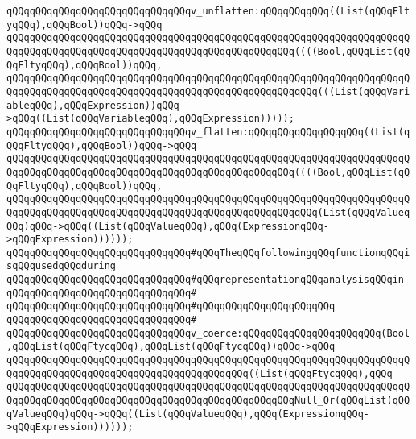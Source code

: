 \newline
\verb|qQQqqQQqqQQqqQQqqQQqqQQqqQQqqQQqv_unflatten:qQQqqQQqqQQq((List(qQQqFltyqQQq),qQQqBool))qQQq->qQQq|\newline
\verb|qQQqqQQqqQQqqQQqqQQqqQQqqQQqqQQqqQQqqQQqqQQqqQQqqQQqqQQqqQQqqQQqqQQqqQQqqQQqqQQqqQQqqQQqqQQqqQQqqQQqqQQqqQQqqQQqqQQqqQQq((((Bool,qQQqList(qQQqFltyqQQq),qQQqBool))qQQq,|\newline
\verb|qQQqqQQqqQQqqQQqqQQqqQQqqQQqqQQqqQQqqQQqqQQqqQQqqQQqqQQqqQQqqQQqqQQqqQQqqQQqqQQqqQQqqQQqqQQqqQQqqQQqqQQqqQQqqQQqqQQqqQQqqQQq(((List(qQQqVariableqQQq),qQQqExpression))qQQq->qQQq((List(qQQqVariableqQQq),qQQqExpression)))));|\newline
\newline
\verb|qQQqqQQqqQQqqQQqqQQqqQQqqQQqqQQqv_flatten:qQQqqQQqqQQqqQQqqQQq((List(qQQqFltyqQQq),qQQqBool))qQQq->qQQq|\newline
\verb|qQQqqQQqqQQqqQQqqQQqqQQqqQQqqQQqqQQqqQQqqQQqqQQqqQQqqQQqqQQqqQQqqQQqqQQqqQQqqQQqqQQqqQQqqQQqqQQqqQQqqQQqqQQqqQQqqQQqqQQq((((Bool,qQQqList(qQQqFltyqQQq),qQQqBool))qQQq,|\newline
\verb|qQQqqQQqqQQqqQQqqQQqqQQqqQQqqQQqqQQqqQQqqQQqqQQqqQQqqQQqqQQqqQQqqQQqqQQqqQQqqQQqqQQqqQQqqQQqqQQqqQQqqQQqqQQqqQQqqQQqqQQqqQQq(List(qQQqValueqQQq)qQQq->qQQq((List(qQQqValueqQQq),qQQq(ExpressionqQQq->qQQqExpression))))));|\newline
\newline
\verb|qQQqqQQqqQQqqQQqqQQqqQQqqQQqqQQq#qQQqTheqQQqfollowingqQQqfunctionqQQqisqQQqusedqQQqduring|\newline
\verb|qQQqqQQqqQQqqQQqqQQqqQQqqQQqqQQq#qQQqrepresentationqQQqanalysisqQQqin|\newline
\verb|qQQqqQQqqQQqqQQqqQQqqQQqqQQqqQQq#|\newline
\verb|qQQqqQQqqQQqqQQqqQQqqQQqqQQqqQQq#qQQqqQQqqQQqqQQqqQQq|\verb|qQQq|\newline
\verb|qQQqqQQqqQQqqQQqqQQqqQQqqQQqqQQq#|\newline
\verb|qQQqqQQqqQQqqQQqqQQqqQQqqQQqqQQqv_coerce:qQQqqQQqqQQqqQQqqQQqqQQq(Bool,qQQqList(qQQqFtycqQQq),qQQqList(qQQqFtycqQQq))qQQq->qQQq|\newline
\verb|qQQqqQQqqQQqqQQqqQQqqQQqqQQqqQQqqQQqqQQqqQQqqQQqqQQqqQQqqQQqqQQqqQQqqQQqqQQqqQQqqQQqqQQqqQQqqQQqqQQqqQQqqQQqqQQq((List(qQQqFtycqQQq),qQQq|\newline
\verb|qQQqqQQqqQQqqQQqqQQqqQQqqQQqqQQqqQQqqQQqqQQqqQQqqQQqqQQqqQQqqQQqqQQqqQQqqQQqqQQqqQQqqQQqqQQqqQQqqQQqqQQqqQQqqQQqqQQqqQQqNull_Or(qQQqList(qQQqValueqQQq)qQQq->qQQq((List(qQQqValueqQQq),qQQq(ExpressionqQQq->qQQqExpression))))));|\newline
